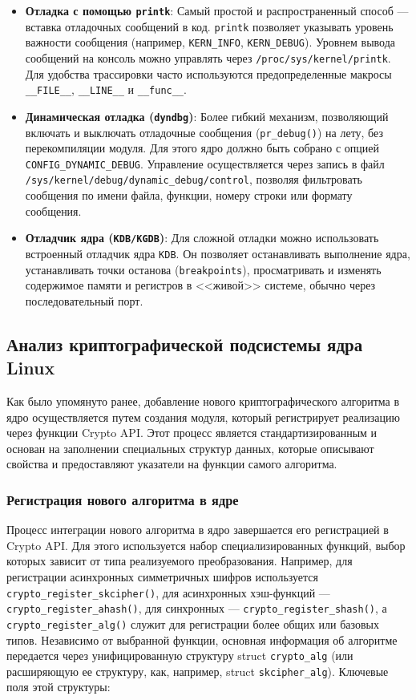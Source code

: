 \begin{itemize}
    \item \textbf{Отладка с помощью \texttt{printk}}: Самый простой и распространенный способ --- вставка отладочных сообщений в код. \texttt{printk} позволяет указывать уровень важности сообщения (например, \texttt{KERN\_INFO}, \texttt{KERN\_DEBUG}). Уровнем вывода сообщений на консоль можно управлять через \texttt{/proc/sys/kernel/printk}. Для удобства трассировки часто используются предопределенные макросы \texttt{\_\_FILE\_\_}, \texttt{\_\_LINE\_\_} и \texttt{\_\_func\_\_}.

    \item \textbf{Динамическая отладка (\texttt{dyndbg})}: Более гибкий механизм, позволяющий включать и выключать отладочные сообщения (\texttt{pr\_debug()}) на лету, без перекомпиляции модуля. Для этого ядро должно быть собрано с опцией \texttt{CONFIG\_DYNAMIC\_DEBUG}. Управление осуществляется через запись в файл \texttt{/sys/kernel/debug/dynamic\_debug/control}, позволяя фильтровать сообщения по имени файла, функции, номеру строки или формату сообщения.

    \item \textbf{Отладчик ядра (\texttt{KDB/KGDB})}: Для сложной отладки можно использовать встроенный отладчик ядра \texttt{KDB}. Он позволяет останавливать выполнение ядра, устанавливать точки останова (\texttt{breakpoints}), просматривать и изменять содержимое памяти и регистров в <<живой>> системе, обычно через последовательный порт.
\end{itemize}


\subsection{Анализ криптографической подсистемы ядра Linux}

Как было упомянуто ранее, добавление нового криптографического алгоритма в ядро осуществляется путем создания модуля, который регистрирует реализацию через функции Crypto API.
Этот процесс является стандартизированным и основан на заполнении специальных структур данных, которые описывают свойства и предоставляют указатели на функции самого алгоритма.

\subsubsection{Регистрация нового алгоритма в ядре}

Процесс интеграции нового алгоритма в ядро завершается его регистрацией в Crypto API.
Для этого используется набор специализированных функций, выбор которых зависит от типа реализуемого преобразования.
Например, для регистрации асинхронных симметричных шифров используется \texttt{crypto_register_skcipher()}, для асинхронных хэш-функций — \texttt{crypto_register_ahash()}, для синхронных — \texttt{crypto_register_shash()}, а \texttt{crypto_register_alg()} служит для регистрации более общих или базовых типов.
Независимо от выбранной функции, основная информация об алгоритме передается через унифицированную структуру struct \texttt{crypto_alg} (или расширяющую ее структуру, как, например, struct \texttt{skcipher_alg}).
Ключевые поля этой структуры:


